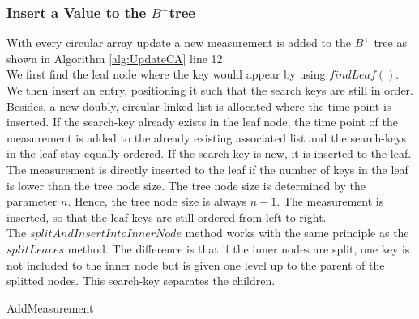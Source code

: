 \documentclass[abstracton,12pt]{scrreprt}
\begin{document}
\subsubsection{Insert a Value to the $B^+$tree}
With every circular array update a new measurement is added to the $B^+$ tree as shown in Algorithm \ref{alg:UpdateCA} line 12.\\
We first find the leaf node where the key would
appear by using $findLeaf()$. We then insert an entry, positioning it such that the search keys are still in order. Besides, a new doubly, circular linked list is allocated where the time point is inserted. If the search-key already exists in the leaf node, the time point of the measurement is added to the already existing associated list and the search-keys in the leaf stay equally ordered. If the search-key is new, it is inserted to the leaf. \\
The measurement is directly inserted to the leaf if the number of keys in the leaf is lower than the tree node size. The tree node size is determined by the parameter $n$. Hence, the tree node size is always $n-1$. The measurement is inserted, so that the leaf keys are still ordered from left to right. \\
The $splitAndInsertIntoInnerNode$ method works with the same principle as the $splitLeaves$ method. The difference is that if the inner nodes are split, one key is not included to the inner node but is given one level up to the parent of the splitted nodes. This search-key separates the children. \\
\begin{algorithm}[H]
	\IncMargin{1em}
	\SetAlgoLined
	\DontPrintSemicolon
	
	
	

	\caption{AddMeasurement}	\label{AddMeasurement}
\end{algorithm}
\end{document}
